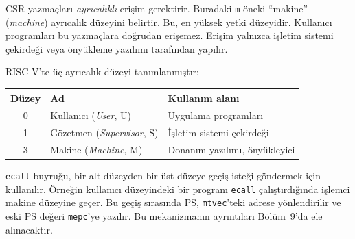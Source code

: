 CSR yazmaçları \emph{ayrıcalıklı} erişim gerektirir. Buradaki \texttt{m} öneki ``makine'' (\emph{machine}) ayrıcalık düzeyini belirtir. Bu, en yüksek yetki düzeyidir. Kullanıcı programları bu yazmaçlara doğrudan erişemez. Erişim yalnızca işletim sistemi çekirdeği veya önyükleme yazılımı tarafından yapılır.

RISC-V'te üç ayrıcalık düzeyi tanımlanmıştır:

\begin{center}
\small
\begin{tabular}{cll}
\toprule
Düzey & Ad & Kullanım alanı \\
\midrule
0 & Kullanıcı (\emph{User}, U) & Uygulama programları \\
1 & Gözetmen (\emph{Supervisor}, S) & İşletim sistemi çekirdeği \\
3 & Makine (\emph{Machine}, M) & Donanım yazılımı, önyükleyici \\
\bottomrule
\end{tabular}
\end{center}

\texttt{ecall} buyruğu, bir alt düzeyden bir üst düzeye geçiş isteği göndermek için kullanılır. Örneğin kullanıcı düzeyindeki bir program \texttt{ecall} çalıştırdığında işlemci makine düzeyine geçer. Bu geçiş sırasında PS, \texttt{mtvec}'teki adrese yönlendirilir ve eski PS değeri \texttt{mepc}'ye yazılır. Bu mekanizmanın ayrıntıları Bölüm~9'da ele alınacaktır.

